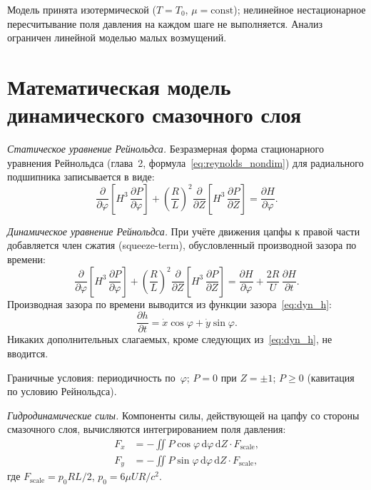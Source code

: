 Модель принята изотермической ($T = T_0$,
$\mu = \mathrm{const}$); нелинейное нестационарное
пересчитывание поля давления на каждом шаге не выполняется.
Анализ ограничен линейной моделью малых возмущений.


\section{Математическая модель динамического смазочного слоя}

\textit{Статическое уравнение Рейнольдса.}
Безразмерная форма стационарного уравнения Рейнольдса
(глава~2, формула~\eqref{eq:reynolds_nondim}) для радиального
подшипника записывается в виде:
\begin{equation}
  \frac{\partial}{\partial\varphi}\!\left[H^3\,
    \frac{\partial P}{\partial\varphi}\right]
  + \left(\frac{R}{L}\right)^{\!2}
    \frac{\partial}{\partial Z}\!\left[H^3\,
    \frac{\partial P}{\partial Z}\right]
  = \frac{\partial H}{\partial\varphi}.
  \label{eq:dyn_reynolds_stat}
\end{equation}

\textit{Динамическое уравнение Рейнольдса.}
При учёте движения цапфы к правой части добавляется член сжатия
(squeeze-term), обусловленный производной зазора по времени:
\begin{equation}
  \frac{\partial}{\partial\varphi}\!\left[H^3\,
    \frac{\partial P}{\partial\varphi}\right]
  + \left(\frac{R}{L}\right)^{\!2}
    \frac{\partial}{\partial Z}\!\left[H^3\,
    \frac{\partial P}{\partial Z}\right]
  = \frac{\partial H}{\partial\varphi}
    + \frac{2R}{U}\,\frac{\partial H}{\partial t}.
  \label{eq:dyn_reynolds_dyn}
\end{equation}
Производная зазора по времени выводится из функции
зазора~\eqref{eq:dyn_h}:
\begin{equation}
  \frac{\partial h}{\partial t}
    = \dot{x}\cos\varphi + \dot{y}\sin\varphi.
  \label{eq:dyn_squeeze}
\end{equation}
Никаких дополнительных слагаемых, кроме следующих
из~\eqref{eq:dyn_h}, не вводится.

Граничные условия: периодичность по~$\varphi$; $P = 0$ при
$Z = \pm 1$; $P \geq 0$ (кавитация по условию Рейнольдса).

\textit{Гидродинамические силы.}
Компоненты силы, действующей на цапфу со стороны смазочного слоя,
вычисляются интегрированием поля давления:
\begin{align}
  F_x &= -\iint P\cos\varphi\,\mathrm{d}\varphi\,\mathrm{d}Z
    \cdot F_{\mathrm{scale}},
  \label{eq:dyn_Fx} \\
  F_y &= -\iint P\sin\varphi\,\mathrm{d}\varphi\,\mathrm{d}Z
    \cdot F_{\mathrm{scale}},
  \label{eq:dyn_Fy}
\end{align}
где $F_{\mathrm{scale}} = p_0 R L / 2$,\;
$p_0 = 6\mu U R / c^2$.

